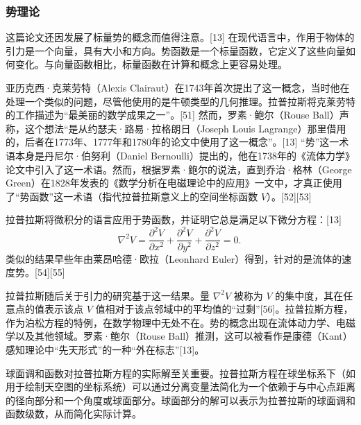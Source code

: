 \subsubsection{势理论}  
这篇论文还因发展了标量势的概念而值得注意。[13] 在现代语言中，作用于物体的引力是一个向量，具有大小和方向。势函数是一个标量函数，它定义了这些向量如何变化。与向量函数相比，标量函数在计算和概念上更容易处理。

亚历克西·克莱劳特（Alexis Clairaut）在1743年首次提出了这一概念，当时他在处理一个类似的问题，尽管他使用的是牛顿类型的几何推理。拉普拉斯将克莱劳特的工作描述为“最美丽的数学成果之一”。[51] 然而，罗素·鲍尔（Rouse Ball）声称，这个想法“是从约瑟夫·路易·拉格朗日（Joseph Louis Lagrange）那里借用的，后者在1773年、1777年和1780年的论文中使用了这一概念”。[13] “势”这一术语本身是丹尼尔·伯努利（Daniel Bernoulli）提出的，他在1738年的《流体力学》论文中引入了这一术语。然而，根据罗素·鲍尔的说法，直到乔治·格林（George Green）在1828年发表的《数学分析在电磁理论中的应用》一文中，才真正使用了“势函数”这一术语（指代拉普拉斯意义上的空间坐标函数 \( V \)）。[52][53]

拉普拉斯将微积分的语言应用于势函数，并证明它总是满足以下微分方程：[13]
\[
\nabla^2 V = \frac{\partial^2 V}{\partial x^2} + \frac{\partial^2 V}{\partial y^2} + \frac{\partial^2 V}{\partial z^2} = 0.~
\]
类似的结果早些年由莱昂哈德·欧拉（Leonhard Euler）得到，针对的是流体的速度势。[54][55]

拉普拉斯随后关于引力的研究基于这一结果。量 \(\nabla^2 V\) 被称为 \(V\) 的集中度，其在任意点的值表示该点 \(V\) 值相对于该点邻域中的平均值的“过剩”[56]。拉普拉斯方程，作为泊松方程的特例，在数学物理中无处不在。势的概念出现在流体动力学、电磁学以及其他领域。罗素·鲍尔（Rouse Ball）推测，这可以被看作是康德（Kant）感知理论中“先天形式”的一种“外在标志”[13]。

球面调和函数对拉普拉斯方程的实际解至关重要。拉普拉斯方程在球坐标系下（如用于绘制天空图的坐标系统）可以通过分离变量法简化为一个依赖于与中心点距离的径向部分和一个角度或球面部分。球面部分的解可以表示为拉普拉斯的球面调和函数级数，从而简化实际计算。
